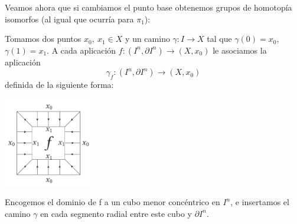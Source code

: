 Veamos ahora que si cambiamos el punto base obtenemos grupos de homotopía isomorfos (al igual que ocurría para $\pi_1$): \par
Tomamos dos puntos $x_0, \ x_1 \in X$ y un camino $\gamma : I \longrightarrow X$ tal que $\gamma(0) = x_0$, $\gamma(1) = x_1$. A cada aplicación $f : (I^n, \partial I^n) \longrightarrow (X, x_0)$ le asociamos la aplicación
\[
\gamma_f : (I^n, \partial I^n) \longrightarrow (X, x_0)
\]
definida de la siguiente forma: \par
\begin{floatingfigure}[r]{0.3\textwidth}
\includegraphics[width = 0.3\textwidth]{images/cambioptobase}
\end{floatingfigure}

Encogemos el dominio de f a un cubo menor concéntrico en $I^n$, e insertamos el camino $\gamma$ en cada segmento radial entre este cubo y $\partial I^n$. \par

